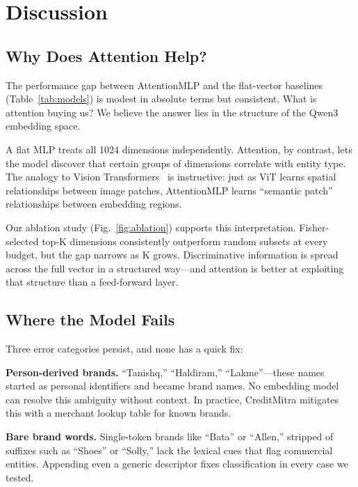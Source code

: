 \documentclass[conference]{IEEEtran}
\begin{document}
\section{Discussion}
\label{sec:discussion}

\subsection{Why Does Attention Help?}

The performance gap between AttentionMLP and the flat-vector baselines (Table~\ref{tab:models}) is modest in absolute terms but consistent. What is attention buying us? We believe the answer lies in the structure of the Qwen3 embedding space.

A flat MLP treats all 1024 dimensions independently. Attention, by contrast, lets the model discover that certain groups of dimensions correlate with entity type. The analogy to Vision Transformers~\cite{dosovitskiy2021vit} is instructive: just as ViT learns spatial relationships between image patches, AttentionMLP learns ``semantic patch'' relationships between embedding regions.

Our ablation study (Fig.~\ref{fig:ablation}) supports this interpretation. Fisher-selected top-K dimensions consistently outperform random subsets at every budget, but the gap narrows as K grows. Discriminative information is spread across the full vector in a structured way---and attention is better at exploiting that structure than a feed-forward layer.

\subsection{Where the Model Fails}

Three error categories persist, and none has a quick fix:

\textbf{Person-derived brands.} ``Tanishq,'' ``Haldiram,'' ``Lakme''---these names started as personal identifiers and became brand names. No embedding model can resolve this ambiguity without context. In practice, CreditMitra mitigates this with a merchant lookup table for known brands.

\textbf{Bare brand words.} Single-token brands like ``Bata'' or ``Allen,'' stripped of suffixes such as ``Shoes'' or ``Solly,'' lack the lexical cues that flag commercial entities. Appending even a generic descriptor fixes classification in every case we tested.
\end{document}
